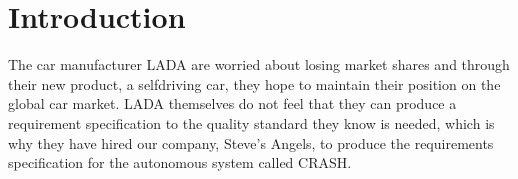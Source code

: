 \documentclass{article}
\begin{document}

\titleformat{\subsubsection}[runin]{\large\bfseries}{}{0pt}{#1\quad\thesubsubsection}


\begingroup
\hypersetup{linkcolor=black}
\tableofcontents
\thispagestyle{empty}
\endgroup
\newpage
\begingroup
\hypersetup{linkcolor=black}
\listoffigures
\thispagestyle{empty}
\endgroup
\newpage
{}

\section{Introduction}
The car manufacturer LADA are worried about losing market shares and through their new product, a selfdriving car, they hope to maintain their position on the global car market. LADA themselves do not feel that they can produce a requirement specification to the quality standard they know is needed, which is why they have hired our company, Steve's Angels, to produce the requirements specification for the autonomous system called CRASH.

\end{document}
